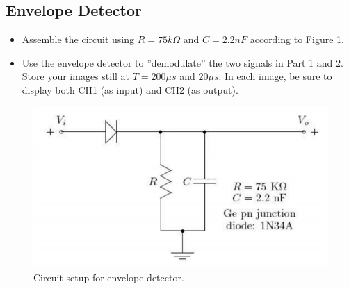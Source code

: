 \documentclass{article}
\begin{document}
\subsection{Envelope Detector}
\begin{itemize}
\item Assemble the circuit using $R = 75 k\Omega$ and $C = 2.2nF$ according to Figure \ref{setup1}.
\item Use the envelope detector to ”demodulate” the two signals in Part 1 and 2. Store your images still at $T = 200\mu s$ and $20\mu s$. In each image, be sure to display both CH1 (as input) and CH2 (as output).
\end{itemize}
\begin{figure}[htbp]
	\centering
	\includegraphics[width=0.7\linewidth]{fig10.png}
	\caption{Circuit setup for envelope detector.}
	\label{setup1}
\end{figure}
\end{document}

